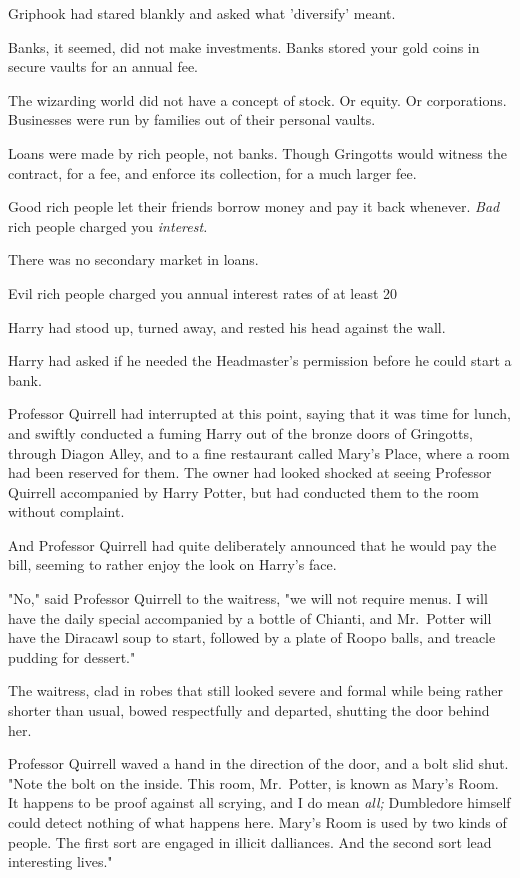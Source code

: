 Griphook had stared blankly and asked what 'diversify' meant.

Banks, it seemed, did not make investments. Banks stored your gold coins in 
secure vaults for an annual fee.

The wizarding world did not have a concept of stock. Or equity. Or 
corporations. Businesses were run by families out of their personal vaults.

Loans were made by rich people, not banks. Though Gringotts would witness the 
contract, for a fee, and enforce its collection, for a much larger fee.

Good rich people let their friends borrow money and pay it back whenever. 
\emph{Bad} rich people charged you \emph{interest.}

There was no secondary market in loans.

Evil rich people charged you annual interest rates of at least 20%

Harry had stood up, turned away, and rested his head against the wall.

Harry had asked if he needed the Headmaster's permission before he could start 
a bank.

Professor Quirrell had interrupted at this point, saying that it was time for 
lunch, and swiftly conducted a fuming Harry out of the bronze doors of 
Gringotts, through Diagon Alley, and to a fine restaurant called Mary's Place, 
where a room had been reserved for them. The owner had looked shocked at seeing 
Professor Quirrell accompanied by Harry Potter, but had conducted them to the 
room without complaint.

And Professor Quirrell had quite deliberately announced that he would pay the 
bill, seeming to rather enjoy the look on Harry's face.

"No," said Professor Quirrell to the waitress, "we will not require menus. I 
will have the daily special accompanied by a bottle of Chianti, and Mr.~Potter 
will have the Diracawl soup to start, followed by a plate of Roopo balls, and 
treacle pudding for dessert."

The waitress, clad in robes that still looked severe and formal while being 
rather shorter than usual, bowed respectfully and departed, shutting the door 
behind her.

Professor Quirrell waved a hand in the direction of the door, and a bolt slid 
shut. "Note the bolt on the inside. This room, Mr.~Potter, is known as Mary's 
Room. It happens to be proof against all scrying, and I do mean \emph{all;} 
Dumbledore himself could detect nothing of what happens here. Mary's Room is 
used by two kinds of people. The first sort are engaged in illicit dalliances. 
And the second sort lead interesting lives."

